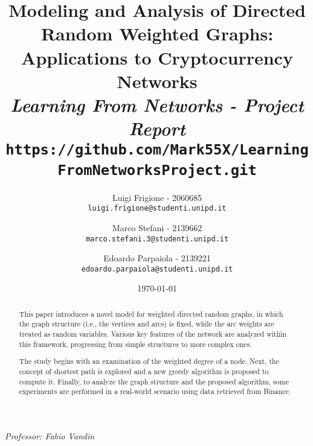 \title{
	\vspace{-2cm}
    \textbf{Modeling and Analysis of Directed Random Weighted Graphs: Applications to Cryptocurrency Networks}\\[.4cm]
    
    {\large\emph{Learning From Networks - Project Report}}
    {\large\texttt{https://github.com/Mark55X/LearningFromNetworksProject.git}}
}

\author{
  Luigi Frigione - 2060685\\
  \texttt{\small{luigi.frigione@studenti.unipd.it}}
  \and
  Marco Stefani - 2139662\\
  \texttt{\small{marco.stefani.3@studenti.unipd.it}}
  \and
  Edoardo Parpaiola - 2139221\\
  \texttt{\small{edoardo.parpaiola@studenti.unipd.it}}
}

\date{\today}

\maketitle

\begin{abstract}
This paper introduces a novel model for weighted directed random graphs, in which the graph structure (i.e., the vertices and arcs) is fixed, while the arc weights are treated as random variables.
Various key features of the network are analyzed within this framework, progressing from simple structures to more complex ones.

The study begins with an examination of the weighted degree of a node.
Next, the concept of shortest path is explored and a new greedy algorithm is proposed to compute it.
Finally, to analyze the graph structure and the proposed algorithm, some experiments are performed in a real-world scenario using data retrieved from Binance.
\end{abstract}

\vfill
{
    \emph{Professor: Fabio Vandin}
}

\newpage

\tableofcontents


